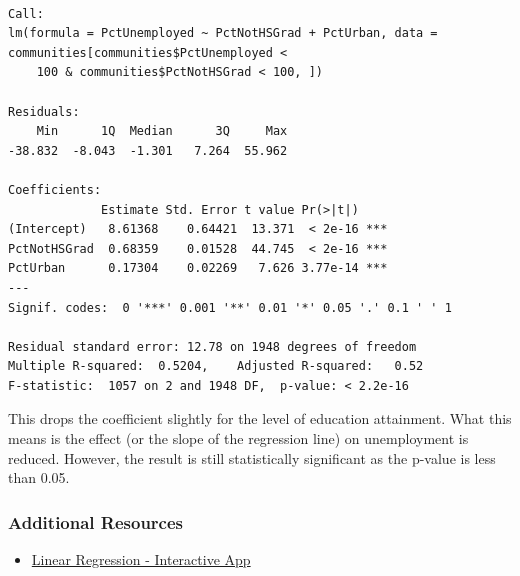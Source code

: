 \documentclass[]{article}
\providecommand{\tightlist}{%
  \setlength{\itemsep}{0pt}\setlength{\parskip}{0pt}}
\begin{document}
\begin{verbatim}

Call:
lm(formula = PctUnemployed ~ PctNotHSGrad + PctUrban, data = communities[communities$PctUnemployed < 
    100 & communities$PctNotHSGrad < 100, ])

Residuals:
    Min      1Q  Median      3Q     Max 
-38.832  -8.043  -1.301   7.264  55.962 

Coefficients:
             Estimate Std. Error t value Pr(>|t|)    
(Intercept)   8.61368    0.64421  13.371  < 2e-16 ***
PctNotHSGrad  0.68359    0.01528  44.745  < 2e-16 ***
PctUrban      0.17304    0.02269   7.626 3.77e-14 ***
---
Signif. codes:  0 '***' 0.001 '**' 0.01 '*' 0.05 '.' 0.1 ' ' 1

Residual standard error: 12.78 on 1948 degrees of freedom
Multiple R-squared:  0.5204,    Adjusted R-squared:   0.52 
F-statistic:  1057 on 2 and 1948 DF,  p-value: < 2.2e-16
\end{verbatim}

This drops the coefficient slightly for the level of education attainment. What this means is the effect (or the slope of the regression line) on unemployment is reduced. However, the result is still statistically significant as the p-value is less than 0.05.

\hypertarget{additional-resources}{%
\subsubsection{Additional Resources}\label{additional-resources}}

\begin{itemize}
\tightlist
\item
  \href{http://altaf.shinyapps.io/linear-regression}{Linear Regression - Interactive App}
\end{itemize}
\end{document}
